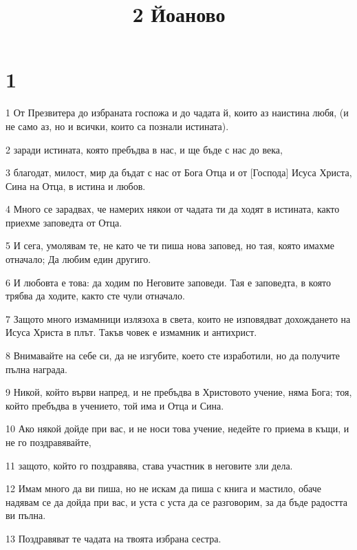 

\title{2 Йоаново}


\chapter{1}

\par 1 От Презвитера до избраната госпожа и до чадата й, които аз наистина любя, (и не само аз, но и всички, които са познали истината).
\par 2 заради истината, която пребъдва в нас, и ще бъде с нас до века,
\par 3 благодат, милост, мир да бъдат с нас от Бога Отца и от [Господа] Исуса Христа, Сина на Отца, в истина и любов.
\par 4 Много се зарадвах, че намерих някои от чадата ти да ходят в истината, както приехме заповедта от Отца.
\par 5 И сега, умолявам те, не като че ти пиша нова заповед, но тая, която имахме отначало; Да любим един другиго.
\par 6 И любовта е това: да ходим по Неговите заповеди. Тая е заповедта, в която трябва да ходите, както сте чули отначало.
\par 7 Защото много измамници излязоха в света, които не изповядват дохождането на Исуса Христа в плът. Такъв човек е измамник и антихрист.
\par 8 Внимавайте на себе си, да не изгубите, което сте изработили, но да получите пълна награда.
\par 9 Никой, който върви напред, и не пребъдва в Христовото учение, няма Бога; тоя, който пребъдва в учението, той има и Отца и Сина.
\par 10 Ако някой дойде при вас, и не носи това учение, недейте го приема в къщи, и не го поздравявайте,
\par 11 защото, който го поздравява, става участник в неговите зли дела.
\par 12 Имам много да ви пиша, но не искам да пиша с книга и мастило, обаче надявам се да дойда при вас, и уста с уста да се разговорим, за да бъде радостта ви пълна.
\par 13 Поздравяват те чадата на твоята избрана сестра.


